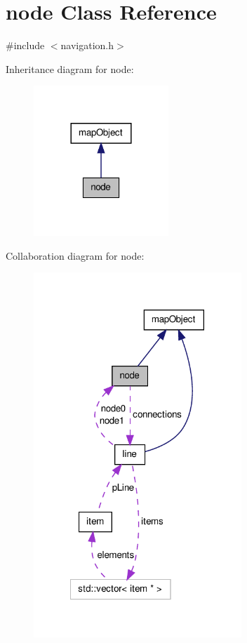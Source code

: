 \hypertarget{classnode}{\section{node \-Class \-Reference}
\label{classnode}
}


{\ttfamily \#include $<$navigation.\-h$>$}



\-Inheritance diagram for node\-:\nopagebreak
\begin{figure}[H]
\begin{center}
\leavevmode
\includegraphics[width=144pt]{classnode__inherit__graph}
\end{center}
\end{figure}


\-Collaboration diagram for node\-:\nopagebreak
\begin{figure}[H]
\begin{center}
\leavevmode
\includegraphics[width=222pt]{classnode__coll__graph}
\end{center}
\end{figure}
